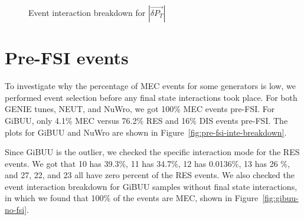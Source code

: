 \documentclass{article}
\newcommand{\vdp}{\vec{\delta P_T}}
\begin{document}
\begin{figure}
    \centering
    \caption{Event interaction breakdown for $|\vdp|$}
    \label{fig:inte-breakdown-dpt}
\end{figure}

\section{Pre-FSI events}

To investigate why the percentage of MEC events for some generators is low, we performed event selection before any final state interactions took place. For both GENIE tunes, NEUT, and NuWro, we got 100\% MEC events pre-FSI. For GiBUU, only 4.1\% MEC versus 76.2\% RES and 16\% DIS events pre-FSI. The plots for GiBUU and NuWro are shown in Figure~\ref{fig:pre-fsi-inte-breakdown}. 

Since GiBUU is the outlier, we checked the specific interaction mode for the RES events. We got that 10 has 39.3\%, 11 has 34.7\%, 12 has 0.0136\%, 13 has 26 \%, and 27, 22, and 23 all have zero percent of the RES events. We also checked the event interaction breakdown for GiBUU samples without final state interactions, in which we found that 100\% of the events are MEC, shown in Figure~\ref{fig:gibuu-no-fsi}.
\end{document}
